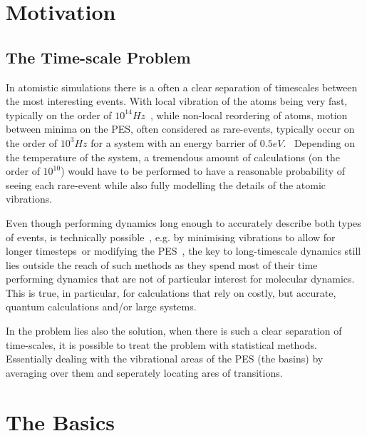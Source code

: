 \section{Motivation}

\subsection{The Time-scale Problem}
\label{sec:tst-timescale-problem}


In atomistic simulations there is a often a clear separation of timescales between the most interesting events.
With local vibration of the atoms being very fast, typically on the order of $10^{14} \unit{Hz}$~\citemiss,
while non-local reordering of atoms, motion between minima on the PES, often considered as rare-events, typically occur on the order of $10^3 \unit{Hz}$ for a system with an energy barrier of $0.5 \unit{eV}$.~\citemiss
Depending on the temperature of the system, a tremendous amount of calculations (on the order of $10^10$) would have to be performed to have a reasonable probability of seeing each rare-event while also fully modelling the details of the atomic vibrations.

Even though performing dynamics long enough to accurately describe both types of events, is technically possible~\citemiss, e.g. by minimising vibrations to allow for longer timesteps~\citemiss or modifying the PES~\cite{hyperdynamics-voter-1997}, the key to long-timescale dynamics still lies outside the reach of such methods as they spend most of their time performing dynamics that are not of particular interest for molecular dynamics.
This is true, in particular, for calculations that rely on costly, but accurate, quantum calculations and/or large systems.

In the problem lies also the solution, when there is such a clear separation of time-scales, it is possible to treat the problem with statistical methods.
Essentially dealing with the vibrational areas of the PES (the basins) by averaging over them and seperately locating ares of transitions.

\section{The Basics}


